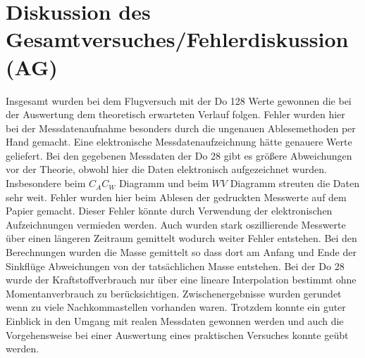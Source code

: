 \section{Diskussion des Gesamtversuches/Fehlerdiskussion (AG)}
Insgesamt wurden bei dem Flugversuch mit der Do 128 Werte gewonnen die bei der Auswertung dem theoretisch erwarteten Verlauf folgen. Fehler wurden hier bei der Messdatenaufnahme besonders durch die ungenauen Ablesemethoden per Hand gemacht. Eine elektronische Messdatenaufzeichnung hätte genauere Werte geliefert.
Bei den gegebenen Messdaten der Do 28 gibt es größere Abweichungen vor der Theorie, obwohl hier die Daten elektronisch aufgezeichnet wurden. Insbesondere beim $C_A C_W$ Diagramm und beim $W V$ Diagramm streuten die Daten sehr weit. Fehler wurden hier beim Ablesen der gedruckten Messwerte auf dem Papier gemacht. Dieser Fehler könnte durch Verwendung der elektronischen Aufzeichnungen vermieden werden. Auch wurden stark oszillierende Messwerte über einen längeren Zeitraum gemittelt wodurch weiter Fehler entstehen.
Bei den Berechnungen wurden die Masse gemittelt so dass dort am Anfang und Ende der Sinkflüge Abweichungen von der tatsächlichen Masse entstehen. Bei der Do 28 wurde der Kraftstoffverbrauch nur über eine lineare Interpolation bestimmt ohne Momentanverbrauch zu berücksichtigen. Zwischenergebnisse wurden gerundet wenn zu viele Nachkommastellen vorhanden waren.
Trotzdem konnte ein guter Einblick in den Umgang mit realen Messdaten gewonnen werden und auch die Vorgehensweise bei einer Auswertung eines praktischen Versuches konnte geübt werden.
